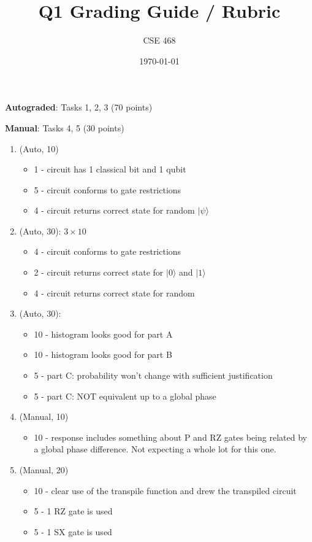 \documentclass[12pt]{article}
\title{Q1 Grading Guide / Rubric}
\author{CSE 468}
\date{\today}
\begin{document}
\maketitle

\noindent \textbf{Autograded}: Tasks 1, 2, 3 (70 points) 

\noindent \textbf{Manual}: Tasks 4, 5 (30 points)

\begin{enumerate}[font=\bfseries]
    \item (Auto, 10) 
    \begin{itemize}
        \item 1 - circuit has 1 classical bit and 1 qubit
        \item 5 - circuit conforms to gate restrictions
        \item 4 - circuit returns correct state for random $|\psi\rangle$
    \end{itemize}
    \item (Auto, 30): $3\times 10$
    \begin{itemize}
        \item 4 - circuit conforms to gate restrictions
        \item 2 - circuit returns correct state for $|0\rangle$ and $|1\rangle$
        \item 4 - circuit returns correct state for random
    \end{itemize}
    \item (Auto, 30):
    \begin{itemize}
        \item 10 - histogram looks good for part A
        \item 10 - histogram looks good for part B
        \item 5 - part C: probability won't change with sufficient justification
        \item 5 - part C: NOT equivalent up to a global phase
    \end{itemize}
    \item (Manual, 10)
    \begin{itemize}
        \item 10 - response includes something about P and RZ gates being related by a global phase difference. Not expecting a whole lot for this one.
    \end{itemize}
    \item (Manual, 20)
    \begin{itemize}
        \item 10 - clear use of the transpile function and drew the transpiled circuit
        \item 5 - 1 RZ gate is used
        \item 5 - 1 SX gate is used
    \end{itemize}
    
    
\end{enumerate}
\end{document}
